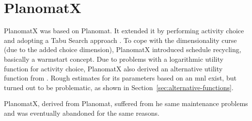 \section{PlanomatX}
\label{sec:planomatX}
PlanomatX was based on Planomat. It extended it by performing activity choice and adopting a Tabu Search approach \citep[][]{Feil_PhDThesis_2010}. To cope with the dimensionality curse (due to the added choice dimension), PlanomatX introduced schedule recycling, basically a warmstart concept. Due to problems with a logarithmic utility function for activity choice, PlanomatX also derived an alternative utility function from \citet[][]{Joh_PhDThesis_2004}. Rough estimates for its parameters based on an \gls{mnl} exist, but turned out to be problematic, as shown in Section~\ref{sec:alternative-functions}.

PlanomatX, derived from Planomat, suffered from he same maintenance problems and was eventually abandoned for the same reasons.







